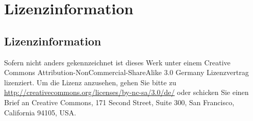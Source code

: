 \part {Lizenzinformation}
\chapter {Lizenzinformation}
Sofern nicht anders gekennzeichnet ist dieses Werk unter einem Creative Commons Attribution-NonCommercial-ShareAlike 3.0 Germany Lizenzvertrag lizenziert. Um die Lizenz anzusehen, gehen Sie bitte zu \url{http://creativecommons.org/licenses/by-nc-sa/3.0/de/} oder schicken Sie einen Brief an Creative Commons, 171 Second Street, Suite 300, San Francisco, California 94105, USA.
